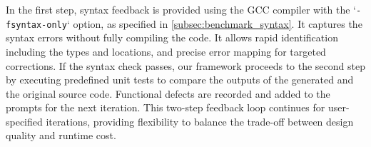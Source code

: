 In the first step,  syntax feedback is provided using the GCC compiler with the `\texttt{-fsyntax-only}` option, as specified in \ref{subsec:benchmark_syntax}.
It captures the syntax errors without fully compiling the code. It allows rapid identification including the types and locations, and precise error mapping for targeted corrections. 
If the syntax check passes, our framework proceeds to the second step by executing predefined unit tests to compare the outputs of the generated and the original source code. 
Functional defects are recorded and added to the prompts for the next iteration. This two-step feedback loop continues for user-specified iterations, providing flexibility to balance the trade-off between design quality and runtime cost.




